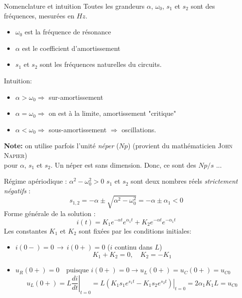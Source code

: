 \begin{frame}{Nomenclature et intuition}
	Toutes les grandeurs $\alpha$, $\omega_0$, $s_1$ et $s_2$ sont des fréquences, mesurées en $Hz$.
	\begin{itemize}
		\item $\omega_0$ est la fréquence de résonance
		\item $\alpha$ est le coefficient d'amortissement 
		\item $s_1$ et $s_2$ sont les fréquences naturelles du circuits.
	\end{itemize}

	\vfill

	Intuition: 
	\begin{itemize}
	\item $\alpha > \omega_0 \Rightarrow $ sur-amortissement  
	\item $\alpha = \omega_0 \Rightarrow $ on est à la limite, amortissement "critique"
	\item $\alpha < \omega_0 \Rightarrow $ sous-amortissement  $\Rightarrow$ oscillations.
	\end{itemize}
	
	\vfill
	\textbf{Note:} on utilise parfois l'unité \textit{néper} ($Np$) (provient du mathématicien \textsc{John Napier})\\ pour $\alpha$, $s_1$ et $s_2$. Un néper est sans dimension. Donc, ce sont des $Np/s$ ...
\end{frame}

\begin{frame}[allowframebreaks]{Régime apériodique : $\alpha^2 - \omega_0^2 > 0 $}	
	$s_1$ et $s_2$ sont deux nombres réels {\em strictement négatifs} :
	{\small \[s_{1,2}=-\alpha \pm \sqrt{\alpha^2-\omega_0^2}= -\alpha \pm \alpha_1 < 0\]}
	Forme générale de la solution :
	{\small \[i(t)=K_1 e^{-\alpha t}e^{\alpha_1 t} + K_2 e^{-\alpha t}e^{-\alpha_1 t}\]}
	Les constantes $K_1$ et $K_2$ sont fixées par les conditions initiales:
	\begin{itemize}
		\item {\small $i(0-)=0\, \rightarrow \, i(0+)=0$ ($i$ continu dans $L$)
			\[K_1+K_2=0, \quad K_2=-K_1\]}
		\item {\small $u_R(0+)=0 \quad \text{puisque~} i(0+)=0 \rightarrow u_L(0+)=u_C(0+)=u_{C0}$
			\[u_L(0+)=\left.L\frac{di}{dt}\right|_{t=0}=\left.L(K_1s_1e^{s_1t}-K_1s_2e^{s_2t})\right|_{t=0}
			=2\alpha_1K_1L=u_{C0}\]}
	\end{itemize}
	\begin{center}
	\end{center}
	
\end{frame}



